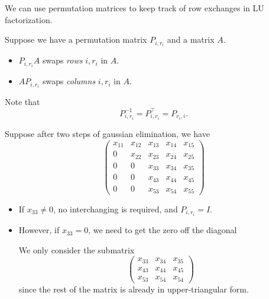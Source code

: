 \begin{remark}
    We can use permutation matrices to keep track of row exchanges in LU factorization.

    Suppose we have a permutation matrix \( P_{i, r_i} \) and a matrix \( A \).

    \begin{itemize}
        \item \( P_{i, r_i} A \) swaps \textit{rows} \( i, r_i \) in \( A \).
        \item \( A P_{i, r_i} \) swaps \textit{columns} \( i, r_i \) in \( A \).
    \end{itemize}
\end{remark}

\begin{note}[Facts]
    Note that \[ P_{i, r_i}^{-1} = P_{i, r_i}^\top = P_{r_i, i}. \]
\end{note}

\begin{example}
    Suppose after two steps of gaussian elimination, we have \[
        \begin{pmatrix}
            x_{11} & x_{12} & x_{13} & x_{14} & x_{15} \\
            0      & x_{22} & x_{23} & x_{24} & x_{25} \\
            0      & 0      & x_{33} & x_{34} & x_{35} \\
            0      & 0      & x_{43} & x_{44} & x_{45} \\
            0      & 0      & x_{53} & x_{54} & x_{55}
        \end{pmatrix}
    \]

    \begin{itemize}
        \item If \( x_{33} \neq 0 \), no interchanging is required, and \( P_{i, r_i} = I \).

        \item However, if \( x_{33} = 0 \), we need to get the zero off the diagonal

              We only consider the submatrix \[
                  \begin{pmatrix}
                      x_{33} & x_{34} & x_{35} \\
                      x_{43} & x_{44} & x_{45} \\
                      x_{53} & x_{54} & x_{54}
                  \end{pmatrix}
              \] since the rest of the matrix is already in upper-triangular form.
    \end{itemize}
\end{example}

